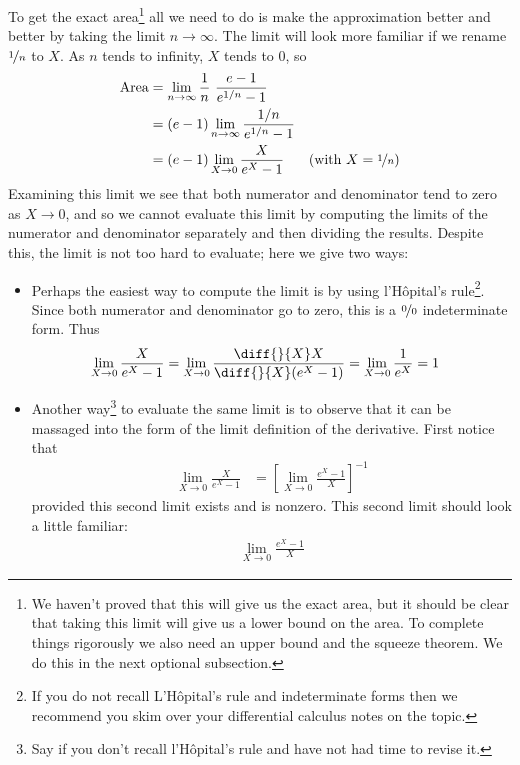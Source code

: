 \begin{eg}
To get the exact area\footnote{We haven't proved that this will give us the
exact area, but it should be clear that taking this limit will give us a lower
bound on the area. To complete things rigorously we also need an upper bound and
the squeeze theorem. We do this in the next optional subsection.} all we need to
do is make the approximation better and better by taking the limit $n\rightarrow
\infty$. The limit will look more familiar if we rename $\nicefrac{1}{n}$ to
$X$. As $n$ tends to infinity, $X$ tends to $0$, so
\begin{align*}
\text{Area}&=\lim_{n\rightarrow\infty} \frac{1}{n}\ \frac{e-1}{e^{1/n}-1} \\
&=(e-1)\lim_{n\rightarrow\infty} \frac{1/n}{e^{1/n}-1} \\
&=(e-1)\lim_{X\rightarrow 0} \frac{X}{e^X-1}
              &\text{(with $X=\nicefrac{1}{n}$)}
\end{align*}
Examining this limit we see that both numerator and denominator tend to zero as $X\to 0$,
and so we cannot evaluate this limit by computing the limits of the numerator and
denominator separately and then dividing the results. Despite this, the limit is not too
hard to evaluate; here we give two ways:
\begin{itemize}
 \item Perhaps the easiest way to compute the limit is by using
l'H\^opital's rule\footnote{If you do not recall L'H\^opital's rule and indeterminate
forms then we recommend you skim over your differential calculus notes on the topic.}.
Since both numerator and denominator go to zero, this is a $\nicefrac00$ indeterminate
form. Thus
\begin{align*}
\lim_{X\rightarrow 0} \frac{X}{e^X-1}
&=\lim_{X\rightarrow 0} \frac{\diff{}{X}X}{\diff{}{X}(e^X-1)}
=\lim_{X\rightarrow 0} \frac{1}{e^X}=1
\end{align*}
\item Another way\footnote{Say if you don't recall l'H\^opital's rule and have not had
time to revise it.} to evaluate the same limit is to observe that it can be massaged
into the form of the limit definition of the derivative. First notice that
\begin{align*}
\lim_{X\rightarrow 0} \frac{X}{e^X-1}
&= \left[\lim_{X\rightarrow 0} \frac{e^X-1}{X} \right]^{-1}
\end{align*}
provided this second limit exists and is nonzero. This second limit should look a little
familiar:
\begin{align*}
\lim_{X\rightarrow 0} \frac{e^X-1}{X}

\end{align*}
\end{itemize}
\end{eg}
